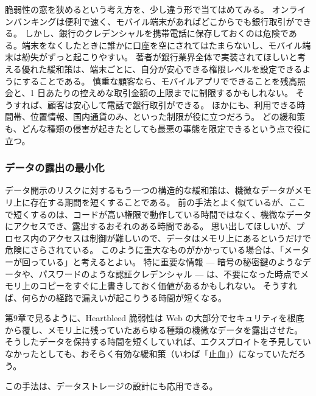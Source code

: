 \documentclass[uplatex]{jsarticle}
\def\label#1{}%
\begin{document}
\begin{exa}[オンラインバンキングにおける端末ごとの権限レベル]\label{exa:ch3-mobile-banking}
脆弱性の窓を狭めるという考え方を、少し違う形で当てはめてみる。
オンラインバンキングは便利で速く、モバイル端末があればどこからでも銀行取引ができる。
しかし、銀行のクレデンシャルを携帯電話に保存しておくのは危険である。端末をなくしたときに誰かに口座を空にされてはたまらないし、モバイル端末は紛失がずっと起こりやすい。
著者が銀行業界全体で実装されてほしいと考える優れた緩和策は、端末ごとに、自分が安心できる権限レベルを設定できるようにすることである。
慎重な顧客なら、モバイルアプリでできることを残高照会と、1 日あたりの控えめな取引金額の上限までに制限するかもしれない。
そうすれば、顧客は安心して電話で銀行取引ができる。
ほかにも、利用できる時間帯、位置情報、国内通貨のみ、といった制限が役に立つだろう。
どの緩和策も、どんな種類の侵害が起きたとしても最悪の事態を限定できるという点で役に立つ。
\end{exa}

\subsubsection{データの露出の最小化}\label{subsec:ch3-minimize-data-exposure}

データ開示のリスクに対するもう一つの構造的な緩和策は、機微なデータがメモリ上に存在する期間を短くすることである。
前の手法とよく似ているが、ここで短くするのは、コードが高い権限で動作している時間ではなく、機微なデータにアクセスでき、露出するおそれのある時間である。
思い出してほしいが、プロセス内のアクセスは制御が難しいので、データはメモリ上にあるというだけで危険にさらされている。
このように重大なものがかかっている場合は、「メーターが回っている」と考えるとよい。
特に重要な情報 --- 暗号の秘密鍵のようなデータや、パスワードのような認証クレデンシャル --- は、不要になった時点でメモリ上のコピーをすぐに上書きしておく価値があるかもしれない。
そうすれば、何らかの経路で漏えいが起こりうる時間が短くなる。

\begin{exa}\label{exa:ch3-heartbleed}
第9章で見るように、Heartbleed 脆弱性は Web の大部分でセキュリティを根底から覆し、メモリ上に残っていたあらゆる種類の機微なデータを露出させた。
そうしたデータを保持する時間を短くしていれば、エクスプロイトを予見していなかったとしても、おそらく有効な緩和策（いわば「止血」）になっていただろう。
\end{exa}

この手法は、データストレージの設計にも応用できる。
\end{document}
